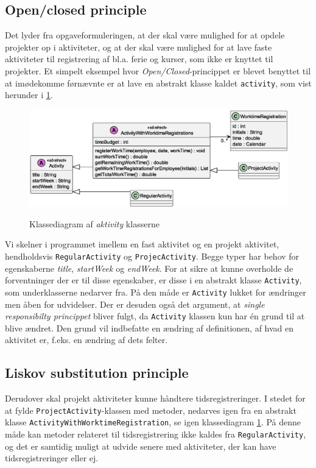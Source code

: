\subsection{Open/closed principle} \label{sec:solid_o}
Det lyder fra opgaveformuleringen, at der skal være mulighed for at opdele projekter op i aktiviteter, og at der skal være mulighed for at lave faste aktiviteter til registrering af bl.a. ferie og kurser, som ikke er knyttet til projekter. Et simpelt eksempel hvor \textit{Open/Closed}-princippet er blevet benyttet til at imødekomme førnævnte er at lave en abstrakt klasse kaldet \texttt{activity}, som vist herunder i \cref{fig:class_activity_example}.
\begin{figure}[H]
  \centering
  \caption{Klassediagram af \textit{aktivity} klasserne}
  \includegraphics[width = 12cm]{ImplementationAndTest/Diagrams/ClassDiagrams/liskov_model_example.eps}
  \label{fig:class_activity_example}
\end{figure}
Vi skelner i programmet imellem en fast aktivitet og en projekt aktivitet, hendholdsvis \texttt{RegularActivity} og \texttt{ProjecActivity}. Begge typer har behov for egenskaberne \textit{title}, \textit{startWeek} og \textit{endWeek}. For at sikre at kunne overholde de forventninger der er til disse egenskaber, er disse i en abstrakt klasse \texttt{Activity}, som underklasserne nedarver fra. På den måde er \texttt{Activity} lukket for ændringer men åben for udvidelser.
Der er desuden også det argument, at \textit{single responsibilty princippet} bliver fulgt, da \texttt{Activity} klassen kun har én grund til at blive ændret. Den grund vil indbefatte en ændring af definitionen, af hvad en aktivitet er, f.eks. en ændring af dets felter.
\subsection{Liskov substitution principle} \label{sec:solid_l}
Derudover skal projekt aktiviteter kunne håndtere tidsregistreringer. I stedet for at fylde \texttt{ProjectActivity}-klassen med metoder, nedarves igen fra en abstrakt klasse \texttt{ActivityWithWorktimeRegistration}, se igen klassediagram \cref{fig:class_activity_example}. På denne måde kan metoder relateret til tidsregistrering ikke kaldes fra \texttt{RegularActivity}, og det er samtidig muligt at udvide senere med aktiviteter, der kan have tidsregistreringer eller ej.
